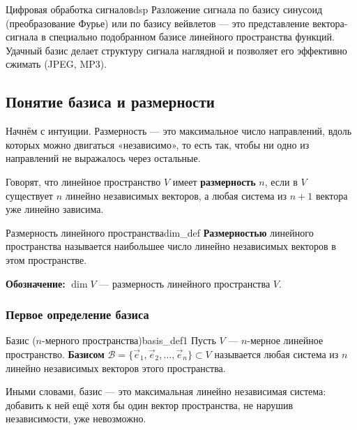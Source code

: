 \documentclass[12pt,a4paper]{article}
\begin{document}
\begin{remarkIT}{Цифровая обработка сигналов}{dsp}
  Разложение сигнала по базису синусоид (преобразование Фурье) или по
  базису вейвлетов --- это представление вектора-сигнала в специально
  подобранном базисе линейного пространства функций. Удачный базис
  делает структуру сигнала наглядной и позволяет его эффективно сжимать
  (JPEG, MP3).
\end{remarkIT}

\subsection*{Понятие базиса и размерности}

Начнём с интуиции. Размерность --- это максимальное число направлений,
вдоль которых можно двигаться «независимо», то есть так, чтобы ни одно
из направлений не выражалось через остальные.

Говорят, что линейное пространство $V$ имеет \textbf{размерность} $n$,
если в $V$ существует $n$ линейно независимых векторов, а любая система
из $n + 1$ вектора уже линейно зависима.

\begin{definition}{Размерность линейного пространства}{dim_def}
  \textbf{Размерностью} линейного пространства называется наибольшее
  число линейно независимых векторов в этом пространстве.

  \medskip
  \textbf{Обозначение:} $\dim V$ --- размерность линейного
  пространства $V$.
\end{definition}

\subsubsection*{Первое определение базиса}

\begin{definition}{Базис ($n$-мерного пространства)}{basis_def1}
  Пусть $V$ --- $n$-мерное линейное пространство. \textbf{Базисом}
  $\mathcal{B} = \{\vec{e}_1, \vec{e}_2, \dots, \vec{e}_n\} \subset V$
  называется любая система из $n$ линейно независимых векторов этого
  пространства.
\end{definition}

Иными словами, базис --- это максимальная линейно независимая система:
добавить к ней ещё хотя бы один вектор пространства, не нарушив
независимости, уже невозможно.
\end{document}
